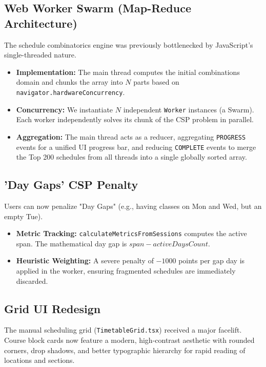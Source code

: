 \documentclass[12pt,a4paper]{article}
\begin{document}
\subsection{Web Worker Swarm (Map-Reduce Architecture)}
The schedule combinatorics engine was previously bottlenecked by JavaScript's single-threaded nature.
\begin{itemize}[label=\textcolor{blue}{\textbullet}]
    \item \textbf{Implementation:} The main thread computes the initial combinations domain and chunks the array into $N$ parts based on \texttt{navigator.hardwareConcurrency}.
    \item \textbf{Concurrency:} We instantiate $N$ independent \texttt{Worker} instances (a Swarm). Each worker independently solves its chunk of the CSP problem in parallel.
    \item \textbf{Aggregation:} The main thread acts as a reducer, aggregating \texttt{PROGRESS} events for a unified UI progress bar, and reducing \texttt{COMPLETE} events to merge the Top 200 schedules from all threads into a single globally sorted array.
\end{itemize}

\subsection{'Day Gaps' CSP Penalty}
Users can now penalize "Day Gaps" (e.g., having classes on Mon and Wed, but an empty Tue).
\begin{itemize}[label=\textcolor{blue}{\textbullet}]
    \item \textbf{Metric Tracking:} \texttt{calculateMetricsFromSessions} computes the active span. The mathematical day gap is $span - activeDaysCount$.
    \item \textbf{Heuristic Weighting:} A severe penalty of $-1000$ points per gap day is applied in the worker, ensuring fragmented schedules are immediately discarded.
\end{itemize}

\subsection{Grid UI Redesign}
The manual scheduling grid (\texttt{TimetableGrid.tsx}) received a major facelift. Course block cards now feature a modern, high-contrast aesthetic with rounded corners, drop shadows, and better typographic hierarchy for rapid reading of locations and sections.
\end{document}
